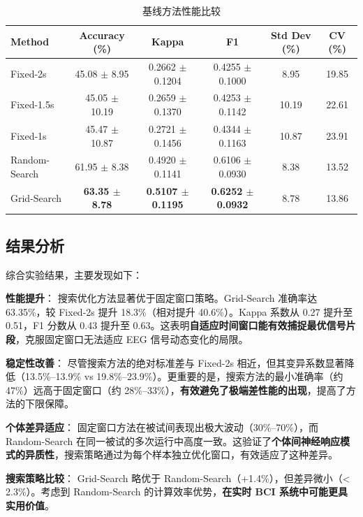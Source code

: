 \begin{table}[H]
\centering
\caption{基线方法性能比较}
\label{tab:baseline_comparison}
\small
\begin{tabular}{lccccc}
\hline
\textbf{Method} & \textbf{Accuracy (\%)} & \textbf{Kappa} & \textbf{F1} & \textbf{Std Dev (\%)} & \textbf{CV (\%)} \\
\hline
Fixed-2s & 45.08 $\pm$ 8.95 & 0.2662 $\pm$ 0.1204 & 0.4255 $\pm$ 0.1000 & 8.95 & 19.85  \\
Fixed-1.5s & 45.05 $\pm$ 10.19 & 0.2659 $\pm$ 0.1370 & 0.4253 $\pm$ 0.1142 & 10.19 & 22.61  \\
Fixed-1s & 45.47 $\pm$ 10.87 & 0.2721 $\pm$ 0.1456 & 0.4344 $\pm$ 0.1163 & 10.87 & 23.91  \\
Random-Search & 61.95 $\pm$ 8.38 & 0.4920 $\pm$ 0.1141 & 0.6106 $\pm$ 0.0930 & 8.38 & 13.52  \\
Grid-Search & \textbf{63.35 $\pm$ 8.78} & \textbf{0.5107 $\pm$ 0.1195} & \textbf{0.6252 $\pm$ 0.0932} & 8.78 & 13.86  \\
\hline
\end{tabular}
\end{table}

\subsection{结果分析}
\label{subsec:results_analysis}

综合实验结果，主要发现如下：

\textbf{性能提升}： 搜索优化方法显著优于固定窗口策略。Grid-Search 准确率达 63.35\%，较 Fixed-2s 提升 18.3\%（相对提升 40.6\%）。Kappa 系数从 0.27 提升至 0.51，F1 分数从 0.43 提升至 0.63。这表明\textbf{自适应时间窗口能有效捕捉最优信号片段}，克服固定窗口无法适应 EEG 信号动态变化的局限。

\textbf{稳定性改善}： 尽管搜索方法的绝对标准差与 Fixed-2s 相近，但其变异系数显著降低（13.5\%--13.9\% vs 19.8\%--23.9\%）。更重要的是，搜索方法的最小准确率（约 47\%）远高于固定窗口（约 28\%--33\%），\textbf{有效避免了极端差性能的出现}，提高了方法的下限保障。

\textbf{个体差异适应}： 固定窗口方法在被试间表现出极大波动（30\%--70\%），而 Random-Search 在同一被试的多次运行中高度一致。这验证了\textbf{个体间神经响应模式的异质性}，搜索策略通过为每个样本独立优化窗口，有效适应了这种差异。

\textbf{搜索策略比较}： Grid-Search 略优于 Random-Search（+1.4\%），但差异微小（< 2.3\%）。考虑到 Random-Search 的计算效率优势，\textbf{在实时 BCI 系统中可能更具实用价值}。

